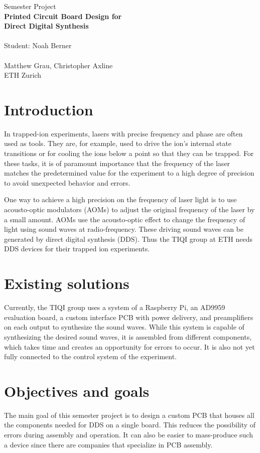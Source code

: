\documentclass[10pt]{article}
\begin{document}
\begingroup  
  \centering
{\Large Semester Project}\\
  \LARGE \textbf{
Printed Circuit Board Design for\\
Direct Digital Synthesis
}\\~\\
  \Large Student: Noah Berner~\\~\\
 
  \large Matthew Grau, Christopher Axline\\
ETH Zurich\\
{
\centering
}
\endgroup

\section*{Introduction}
In trapped-ion experiments, lasers with precise frequency and phase are often used as tools.
They are, for example, used to drive the ion's internal state transitions or for cooling the ions below a point so that they can be trapped.
For these tasks, it is of paramount importance that the frequency of the laser matches the predetermined value for the experiment to a high degree of precision to avoid unexpected behavior and errors.

One way to achieve a high precision on the frequency of laser light is to use acousto-optic modulators (AOMs) to adjust the original frequency of the laser by a small amount.
AOMs use the acousto-optic effect to change the frequency of light using sound waves at radio-frequency.
These driving sound waves can be generated by direct digital synthesis (DDS).
Thus the TIQI group at ETH needs DDS devices for their trapped ion experiments.

\section*{Existing solutions}
Currently, the TIQI group uses a system of a Raspberry Pi, an AD9959 evaluation board, a custom interface PCB with power delivery, and preamplifiers on each output to synthesize the sound waves.
While this system is capable of synthesizing the desired sound waves, it is assembled from different components, which takes time and creates an opportunity for errors to occur.
It is also not yet fully connected to the control system of the experiment.

\section*{Objectives and goals} 
The main goal of this semester project is to design a custom PCB that houses all the components needed for DDS on a single board.
This reduces the possibility of errors during assembly and operation.
It can also be easier to mass-produce such a device since there are companies that specialize in PCB assembly.
\end{document}
